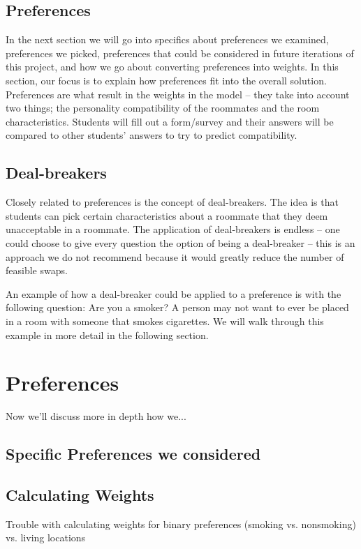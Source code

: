 \documentclass[12pt]{article}
\begin{document}
\begin{multicols}{2}
\subsection{Preferences}
In the next section we will go into specifics about preferences we examined, preferences we picked, preferences that could be considered in future iterations of this project, and how we go about converting preferences into weights. In this section, our focus is to explain how preferences fit into the overall solution.\\
Preferences are what result in the weights in the model – they take into account two things; the personality compatibility of the roommates and the room characteristics. Students will fill out a form/survey and their answers will be compared to other students’ answers to try to predict compatibility. 

\subsection{Deal-breakers} 
Closely related to preferences is the concept of deal-breakers. The idea is that students can pick certain characteristics about a roommate that they deem unacceptable in a roommate. The application of deal-breakers is endless – one could choose to give every question the option of being a deal-breaker – this is an approach we do not recommend because it would greatly reduce the number of feasible swaps. 

An example of how a deal-breaker could be applied to a preference is with the following question: Are you a smoker? A person may not want to ever be placed in a room with someone that smokes cigarettes. We will walk through this example in more detail in the following section.

\section{Preferences}
Now we'll discuss more in depth how we...

\subsection{Specific Preferences we considered}

\subsection{Calculating Weights}
Trouble with calculating weights for binary preferences (smoking vs. nonsmoking) vs. living locations


\end{multicols}
\end{document}
